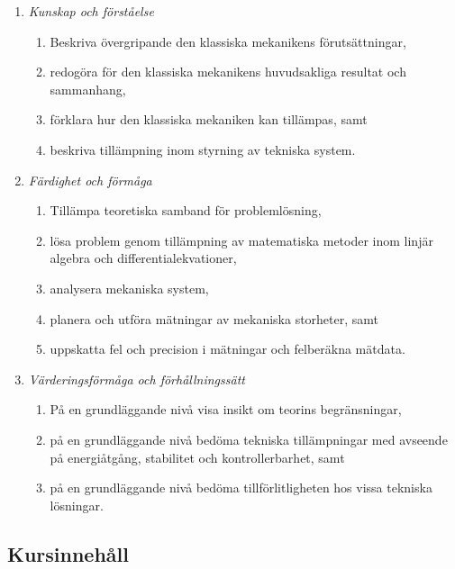 \begin{enumerate}
\def\labelenumi{\Alph{enumi}.}
\tightlist
\item
  \emph{Kunskap och förståelse}

  \begin{enumerate}
  \def\labelenumii{\Alph{enumi}.\arabic{enumii}.}
  \tightlist
  \item
    Beskriva övergripande den klassiska mekanikens förutsättningar,
  \item
    redogöra för den klassiska mekanikens huvudsakliga resultat och
    sammanhang,
  \item
    förklara hur den klassiska mekaniken kan tillämpas, samt
  \item
    beskriva tillämpning inom styrning av tekniska system.
  \end{enumerate}
\item
  \emph{Färdighet och förmåga}

  \begin{enumerate}
  \def\labelenumii{\Alph{enumi}.\arabic{enumii}.}
  \tightlist
  \item
    Tillämpa teoretiska samband för problemlösning,
  \item
    lösa problem genom tillämpning av matematiska metoder inom linjär
    algebra och differentialekvationer,
  \item
    analysera mekaniska system,
  \item
    planera och utföra mätningar av mekaniska storheter, samt
  \item
    uppskatta fel och precision i mätningar och felberäkna mätdata.
  \end{enumerate}
\item
  \emph{Värderingsförmåga och förhållningssätt}

  \begin{enumerate}
  \def\labelenumii{\Alph{enumi}.\arabic{enumii}.}
  \tightlist
  \item
    På en grundläggande nivå visa insikt om teorins begränsningar,
  \item
    på en grundläggande nivå bedöma tekniska tillämpningar med avseende
    på energiåtgång, stabilitet och kontrollerbarhet, samt
  \item
    på en grundläggande nivå bedöma tillförlitligheten hos vissa
    tekniska lösningar.
  \end{enumerate}
\end{enumerate}

\subsection*{Kursinnehåll}

